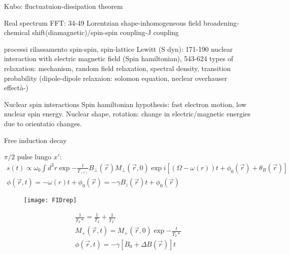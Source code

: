 \begin{wordonframe}{Kubo: fluctuatuion-dissipation theorem}

\end{wordonframe}

\begin{wordonframe}{Real spectrum FFT: 34-49}
Lorentzian shape-inhomogeneous field broadening-chemical shift(diamagnetic)/spin-spin coupling-J coupling
\end{wordonframe}

\begin{wordonframe}{processi rilassamento spin-spin, spin-lattice}
Lewitt (S dyn): 171-190 nuclear interaction with electric magnetic field (Spin hamiltonian), 543-624 types of relaxation: mechanism, random field relaxation, spectral density, transition probability (dipole-dipole relaxaion: solomon equation, neclear overhauser effectà-)
\end{wordonframe}

\begin{wordonframe}{Nuclear spin interactions}
Spin hamiltonian hypothesis: fast electron motion, low nuclear spin energy.
Nuclear shape, rotation: change in electric/magnetic energies due to orientatio changes.
\end{wordonframe}

\begin{frame}[allowframebreaks]{Free induction decay}

$\pi/2$ pulse lungo $x'$:
\begin{align*}
s(t)\propto\omega_0\int d^3r \exp{-\frac{t}{T_(r)}}B_{\perp}(\vec{r})M_{\perp}(\vec{r},0)\exp{i[(\Omega-\omega(r))t+\phi_0(\vec{r})+\theta_B(\vec{r})]}\\
\phi(\vec{r},t)=-\omega(r)t+\phi_0(\vec{r})=-\gamma B_z(\vec{r})t+\phi_0(\vec{r})
\end{align*}
\begin{figure}[!ht]\texttt{[image: FIDrep]}\label{fig:FIDrep}\end{figure}
\begin{align*}
\frac{1}{T_2*}=\frac{1}{T_2}+\frac{1}{T_2'}\\
M_+(\vec{r},t)=M_+(\vec{r},0)\exp{-\frac{t}{T_2*}}\\
\phi(\vec{r},t)=-\gamma[B_0+\Delta B(\vec{r})]t
\end{align*}
\end{frame}

